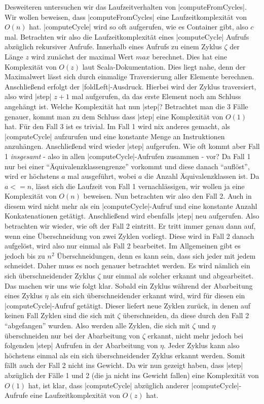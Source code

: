 Desweiteren untersuchen wir das Laufzeitverhalten von |computeFromCycles|. Wir wollen beweisen, dass |computeFromCycles| eine Laufzeitkomplexität von $O(n)$ hat.
|computeCycle| wird so oft aufgerufen, wie es Container gibt, also $c$ mal.
Betrachten wir also die Laufzeitkomplexität eines |computeCycle| Aufrufs abzüglich rekursiver Aufrufe.
Innerhalb eines Aufrufs zu einem Zyklus $\zeta$ der Länge $z$ wird zunächst der maximal Wert $max$ berechnet.
Dies hat eine Komplexität von $O(z)$ laut Scala-Dokumentation. Dies liegt nahe, denn der Maximalwert lässt sich durch einmalige Traversierung aller Elemente berechnen.
Anschließend erfolgt der |foldLeft|-Ausdruck. Hierbei wird der Zyklus traversiert, also wird |step| $z+1$ mal aufgerufen, da das erste Element noch am Schluss angehängt ist.
Welche Komplexität hat nun |step|? Betrachtet man die 3 Fälle genauer, kommt man zu dem Schluss dass |step| eine Komplexität von $O(1)$ hat.
Für den Fall 3 ist es trivial. Im Fall 1 wird nix anderes gemacht, als |computeCycle| aufzurufen und eine konstante Menge an Instruktionen anzuhängen.
Anschließend wird wieder |step| aufgerufen. Wie oft kommt aber Fall 1 \emph{insgesamt} - also in allen |computeCycle|-Aufrufen zusammen - vor?
Da Fall 1 nur bei einer ``Äquivalenzklassengrenze'' vorkommt und diese danach ``auflöst'', wird er höchstens $a$ mal ausgeführt, wobei $a$ die Anzahl Äquivalenzklassen ist.
Da $a <= n$, lässt sich die Laufzeit von Fall 1 vernachlässigen, wir wollen ja eine Komplexität von $O(n)$ beweisen.
Nun betrachten wir also den Fall 2. Auch in diesem wird nicht mehr als ein |computeCycle|-Aufruf und eine konstante Anzahl Konkatenationen getätigt.
Anschließend wird ebenfalls |step| neu aufgerufen. Also betrachten wir wieder, wie oft der Fall 2 eintritt.
Er tritt immer genau dann auf, wenn eine Überschneidung von zwei Zyklen vorliegt. Diese wird in Fall 2 danach aufgelöst, wird also nur einmal als Fall 2 bearbeitet.
Im Allgemeinen gibt es jedoch bis zu $n^2$ Überschneidungen, denn es kann sein, dass sich jeder mit jedem schneidet. Daher muss es noch genauer betrachtet werden.
Es wird nämlich ein sich überschneidender Zyklus $\zeta$ nur einmal als solcher erkannt und abgearbeitet. Das machen wir uns wie folgt klar.
Sobald ein Zyklus während der Abarbeitung eines Zyklus $\eta$ als ein sich überschneidender erkannt wird, wird für diesen ein |computeCycle|-Aufruf getätigt.
Dieser liefert neue Zyklen zurück, in denen auf keinen Fall Zyklen sind die sich mit $\zeta$ überschneiden, da diese durch den Fall 2 ``abgefangen'' wurden.
Also werden alle Zyklen, die sich mit $\zeta$ und $\eta$ überschneiden nur bei der Abarbeitung von $\zeta$ erkannt, nicht mehr jedoch bei folgenden |step| Aufrufen
in der Abarbeitung von $\eta$. Jeder Zyklus kann also höchstens einmal als ein sich überschneidender Zyklus erkannt werden. Somit fällt auch der Fall 2 nicht ins Gewicht.
Da wir nun gezeigt haben, dass |step| abzüglich der Fälle 1 und 2 (die ja nicht ins Gewicht fallen) eine Komplexität von $O(1)$ hat, ist klar, dass
|computeCycle| abzüglich anderer |computeCycle|-Aufrufe eine Laufzeitkomplexität von $O(z)$ hat.

